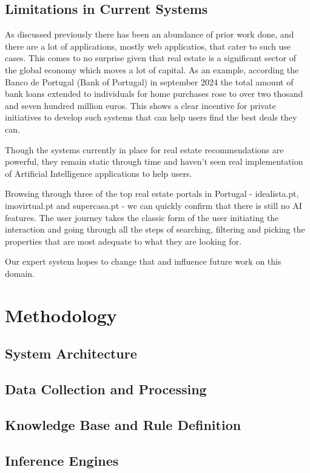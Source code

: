 \documentclass[runningheads]{llncs}
\begin{document}
\subsection{Limitations in Current Systems}

As discussed previously there has been an abundance of prior work done, and there are a lot of applications, mostly web applicatios, that cater to such use cases. This comes to no surprise given that real estate is a significant sector of the global economy which moves a lot of capital. As an example, according the Banco de Portugal (Bank of Portugal)\cite{bancoportugal} in september 2024 the total amount of bank loans extended to individuals for home purchases rose to over two thosand and seven hundred million euros. This shows a clear incentive for private initiatives to develop such systems that can help users find the best deals they can.

Though the systems currently in place for real estate recommendations are powerful, they remain static through time and haven't seen real implementation of Artificial Intelligence applications to help users.

Browsing through three of the top real estate portals in Portugal - idealista.pt, imovirtual.pt and supercasa.pt - we can quickly confirm that there is still no AI features. The user journey takes the classic form of the user initiating the interaction and going through all the steps of searching, filtering and picking the properties that are most adequate to what they are looking for. 

Our expert system hopes to change that and influence future work on this domain. 

\section{Methodology}
\subsection{System Architecture}

\subsection{Data Collection and Processing}
\subsection{Knowledge Base and Rule Definition}
\subsection{Inference Engines}
\end{document}
